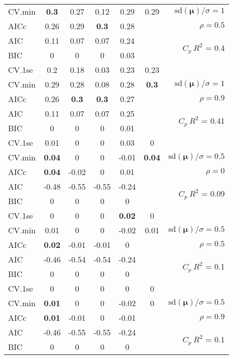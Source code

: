 \documentclass[12pt]{article}
\newcommand{\mr}[1]{\mathrm{#1}}
\newcommand{\bm}[1]{\mathbf{#1}}
\begin{document}
\begin{table}[p]
\begin{center}
\begin{tabular}{l*{5}{c}|r}
CV.min & {\bf 0.3} & 0.27 & 0.12 & 0.29 & 0.29 &  $\mr{sd}(\bm{\mu})/\sigma=1$ \\
AICc & 0.26 & 0.29 & {\bf 0.3} & 0.28 & & $\rho=0.5$ \\
AIC & 0.11 & 0.07 & 0.07 & 0.24 & & \multirow{2}{*}{$C_p ~ R^2$ = 0.4} \\
BIC & 0 & 0 & 0 & 0.03 & & \\
 \hline 
CV.1se & 0.2 & 0.18 & 0.03 & 0.23 & 0.23 &\\
CV.min & 0.29 & 0.28 & 0.08 & 0.28 & {\bf 0.3} &  $\mr{sd}(\bm{\mu})/\sigma=1$ \\
AICc & 0.26 & {\bf 0.3} & {\bf 0.3} & 0.27 & & $\rho=0.9$ \\
AIC & 0.11 & 0.07 & 0.07 & 0.25 & & \multirow{2}{*}{$C_p ~ R^2$ = 0.41} \\
BIC & 0 & 0 & 0 & 0.01 & & \\
 \hline 
CV.1se & 0.01 & 0 & 0 & 0.03 & 0 &\\
CV.min & {\bf 0.04} & 0 & 0 & -0.01 & {\bf 0.04} &  $\mr{sd}(\bm{\mu})/\sigma=0.5$ \\
AICc & {\bf 0.04} & -0.02 & 0 & 0.01 & & $\rho=0$ \\
AIC & -0.48 & -0.55 & -0.55 & -0.24 & & \multirow{2}{*}{$C_p ~ R^2$ = 0.09} \\
BIC & 0 & 0 & 0 & 0 & & \\
 \hline 
CV.1se & 0 & 0 & 0 & {\bf 0.02} & 0 &\\
CV.min & 0.01 & 0 & 0 & -0.02 & 0.01 &  $\mr{sd}(\bm{\mu})/\sigma=0.5$ \\
AICc & {\bf 0.02} & -0.01 & -0.01 & 0 & & $\rho=0.5$ \\
AIC & -0.46 & -0.54 & -0.54 & -0.24 & & \multirow{2}{*}{$C_p ~ R^2$ = 0.1} \\
BIC & 0 & 0 & 0 & 0 & & \\
 \hline 
CV.1se & 0 & 0 & 0 & 0 & 0 &\\
CV.min & {\bf 0.01} & 0 & 0 & -0.02 & 0 &  $\mr{sd}(\bm{\mu})/\sigma=0.5$ \\
AICc & {\bf 0.01} & -0.01 & 0 & -0.01 & & $\rho=0.9$ \\
AIC & -0.46 & -0.55 & -0.55 & -0.24 & & \multirow{2}{*}{$C_p ~ R^2$ = 0.1} \\
BIC & 0 & 0 & 0 & 0 & & \\
 \hline 
\end{tabular}
\end{center}
\vspace{-1cm}
\end{table}
\end{document}
